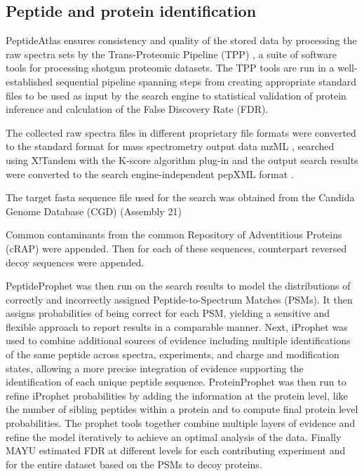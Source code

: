 \subsection*{Peptide and protein identification}

PeptideAtlas ensures consistency and quality of the stored data
by processing the raw spectra sets by the Trans-Proteomic
Pipeline (TPP) \citep{Deutsch2010c}, a suite of software tools for processing
shotgun proteomic datasets. The TPP tools are run in a well-
established sequential pipeline spanning steps from creating
 appropriate standard files to be used as input by the
search engine to statistical validation of protein inference
and calculation of the False Discovery Rate (FDR).

The collected raw spectra files in different proprietary file
formats were converted to the standard format for mass
spectrometry output data mzML \citep{Martens2011}, searched using X!Tandem
\citep{Craig2004} with the K-score algorithm plug-in \citep{MacLean2006} and the output search
results were converted to the search engine-independent
pepXML format \citep{Keller2005}.

The target fasta sequence file used for the search was
obtained from the Candida Genome Database (CGD) \citep{Costanzo2006a} (Assembly 21)

Common contaminants from the common Repository of
Adventitious Proteins (cRAP) were appended. Then for each of
these sequences, counterpart reversed decoy sequences were
appended.

PeptideProphet \citep{Keller2002} was then run on the search results to
model the distributions of correctly and incorrectly assigned
Peptide-to-Spectrum Matches (PSMs). It then assigns probabilities
of being correct for each PSM, yielding a sensitive and flexible
approach to report results in a comparable manner. Next,
iProphet \citep{Shteynberg2011} was used to combine additional sources of evidence
including multiple identifications of the same peptide across
spectra, experiments, and charge and modification states,
allowing a more precise integration of evidence supporting the
identification of each unique peptide sequence. ProteinProphet
\citep{Nesvizhskii2003} was then run to refine iProphet probabilities by adding the
information at the protein level, like the number of sibling
peptides within a protein and to compute final protein level
probabilities. The prophet tools together combine multiple layers
of evidence and refine the model iteratively to achieve an optimal
analysis of the data. Finally MAYU \citep{Reiter2009} estimated FDR at different
levels for each contributing experiment and for the entire dataset
based on the PSMs to decoy proteins.

